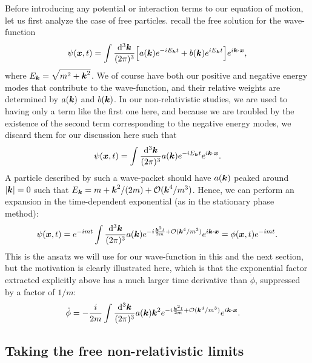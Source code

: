 Before introducing any potential or interaction terms to our equation of motion, let us first analyze the case of free particles.
recall the free solution for the wave-function
\begin{align}
    \psi(\vb*{x},t) = \int \frac{\dd[3]{\vb*{k}}}{(2 \pi)^3} \Big[ a(\vb*{k}) e^{-i E_{\vb*{k}} t} + b(\vb*{k}) e^{i E_{\vb*{k}} t} \Big] e^{i \vb*{k} \cdot \vb*{x}}
,\end{align}
where $E_{\vb*{k}} = \sqrt{m^2 + \vb*{k}^2}$.
We of course have both our positive and negative energy modes that contribute to the wave-function, and their relative weights are determined by $a(\vb*{k})$ and $b(\vb*{k})$.
In our non-relativistic studies, we are used to having only a term like the first one here, and because we are troubled by the existence of the second term corresponding to the negative energy modes, we discard them for our discussion here such that 
\begin{align}
    \psi(\vb*{x},t) = \int \frac{\dd[3]{\vb*{k}}}{(2 \pi)^3} a(\vb*{k}) e^{-i E_{\vb*{k}} t} e^{i \vb*{k} \cdot \vb*{x}}
.\end{align}
A particle described by such a wave-packet should have $a(\vb*{k})$ peaked around $|\vb*{k}| = 0$ such that $E_{\vb*{k}} = m + \vb*{k}^2/(2m) + \mathcal{O}(\vb*{k}^{4}/m^3)$.
Hence, we can perform an expansion in the time-dependent exponential (as in the stationary phase method):
\begin{align}
    \psi(\vb*{x},t) = e^{-i m t} \int \frac{\dd[3]{\vb*{k}}}{(2 \pi)^3} a(\vb*{k}) e^{-i \frac{\vb*{k}^2 t}{2m} + \mathcal{O}(\vb*{k}^{4}/m^3)} e^{i \vb*{k} \cdot \vb*{x}} = \phi(\vb*{x},t) e^{-i m t}
.\end{align}
This is the ansatz we will use for our wave-function in this and the next section, but the motivation is clearly illustrated here, which is that the exponential factor extracted explicitly above has a much larger time derivative than $\dot{\phi}$, suppressed by a factor of $1/m$:
\begin{align}
    \dot{\phi} &= -\frac{i}{2m} \int \frac{\dd[3]{\vb*{k}}}{(2 \pi)^3} a(\vb*{k}) \vb*{k}^2 e^{-i \frac{\vb*{k}^2 t}{2m} + \mathcal{O}(\vb*{k}^{4}/m^3)} e^{i \vb*{k} \cdot \vb*{x}}
.\end{align}


\subsection{Taking the free non-relativistic limits}

